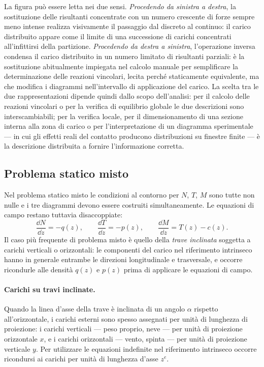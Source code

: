 La figura può essere letta nei due sensi.
\emph{Procedendo da sinistra a destra}, la
sostituzione delle risultanti concentrate con un
numero crescente di forze sempre meno intense
realizza visivamente il passaggio dal discreto al
continuo: il carico distribuito appare come il
limite di una successione di carichi concentrati
all'infittirsi della partizione. \emph{Procedendo
	da destra a sinistra}, l'operazione inversa
condensa il carico distribuito in un numero
limitato di risultanti parziali: è la sostituzione
abitualmente impiegata nel calcolo manuale per
semplificare la determinazione delle reazioni
vincolari, lecita perché staticamente equivalente,
ma che modifica i diagrammi nell'intervallo di
applicazione del carico. La scelta tra le due
rappresentazioni dipende quindi dallo scopo
dell'analisi: per il calcolo delle reazioni
vincolari o per la verifica di equilibrio globale
le due descrizioni sono interscambiabili; per la
verifica locale, per il dimensionamento di una
sezione interna alla zona di carico o per
l'interpretazione di un diagramma sperimentale
--- in cui gli effetti reali del contatto producono
distribuzioni su finestre finite --- è la
descrizione distribuita a fornire l'informazione
corretta.






\subsection{Problema statico misto}
\label{sec:esempi_misto}

Nel problema statico misto le condizioni al contorno
per $N$, $T$, $M$ sono tutte non nulle e i tre
diagrammi devono essere costruiti simultaneamente.
Le equazioni di campo restano tuttavia disaccoppiate:
\begin{equation*}
	\frac{\dd N}{\dd z} = -q(z), \qquad
	\frac{\dd T}{\dd z} = -p(z), \qquad
	\frac{\dd M}{\dd z} = T(z) - c(z).
\end{equation*}
Il caso più frequente di problema misto è quello
della \emph{trave inclinata} soggetta a carichi
verticali o orizzontali: le componenti del carico
nel riferimento intrinseco hanno in generale
entrambe le direzioni longitudinale e trasversale,
e occorre ricondurle alle densità $q(z)$ e $p(z)$
prima di applicare le equazioni di campo.



\paragraph{Carichi su travi inclinate.}
Quando la linea d'asse della trave è inclinata
di un angolo $\alpha$ rispetto all'orizzontale,
i carichi esterni sono spesso assegnati per
unità di lunghezza di proiezione: i carichi
verticali --- peso proprio, neve --- per unità
di proiezione orizzontale $x$, e i carichi
orizzontali --- vento, spinta --- per unità
di proiezione verticale $y$. Per utilizzare
le equazioni indefinite nel riferimento
intrinseco occorre ricondursi ai carichi per
unità di lunghezza d'asse $z^e$.


